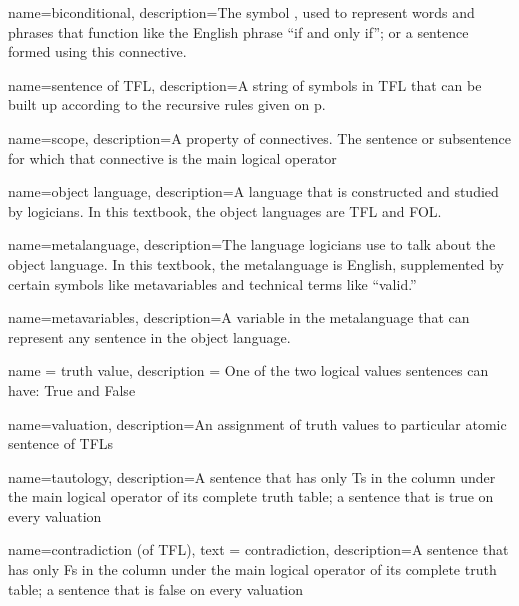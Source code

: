 {
name=biconditional,
description={The symbol \eiff, used to represent words and phrases that function like the English phrase ``if and only if''; or a sentence formed using this connective.}
}



{
name=sentence of TFL,
description={A string of symbols in TFL that can be built up according to the recursive rules given on p.~\pageref{TFLsentences}}
}

{
name=scope,
description={A property of connectives. The sentence or subsentence for which that connective is the main logical operator}
}



{
name=object language,
description={A language that is constructed and studied by logicians. In this textbook,
 the object languages are TFL and FOL.}
}

{
name=metalanguage,
description={The language logicians use to talk about the object language. In this textbook, the metalanguage is English, supplemented by certain symbols like metavariables and technical terms like ``valid.''}
}

{
name=metavariables,
description={A variable in the metalanguage that can represent any sentence in the object language.}
}



{
name = truth value,
description = {One of the two logical values sentences can have: True and False}
}



{
name=valuation,
description={An assignment of \glspl{truth value} to particular atomic \glspl{sentence of TFL}}
}



{
name=tautology,
description={A sentence that has only Ts in the column under the main logical operator of its \gls{complete truth table}; a sentence that is true on every \gls{valuation}}
}

{
  name=contradiction (of TFL),
  text = contradiction,
description={A sentence that has only Fs in the column under the main logical operator of its \gls{complete truth table}; a sentence that is false on every \gls{valuation}}
}



